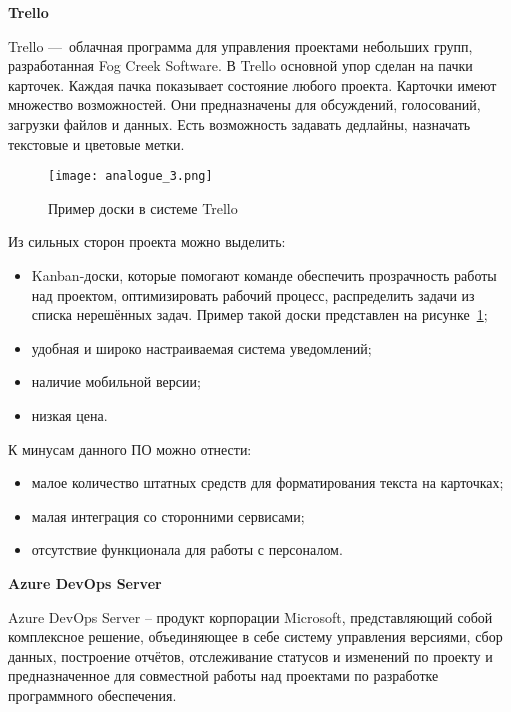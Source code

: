 \bigskip
\textbf{Trello}

Trello — облачная программа для управления проектами небольших групп, разработанная Fog Creek Software. В Trello основной упор сделан на пачки карточек. Каждая пачка показывает состояние любого проекта. Карточки имеют множество возможностей. Они предназначены для обсуждений, голосований, загрузки файлов и данных. Есть возможность задавать дедлайны, назначать текстовые и цветовые метки.

\begin{figure}[ht]
    \centering
	\texttt{[image: analogue\_3.png]}
	\caption{Пример доски в системе Trello}\label{fig:analysis:analogue_3:picture}
\end{figure}

Из сильных сторон проекта можно выделить:
\begin{itemize}
    \item Kanban-доски, которые помогают команде обеспечить прозрачность работы над проектом, оптимизировать рабочий процесс, распределить задачи из списка нерешённых задач. Пример такой доски представлен на рисунке~\ref{fig:analysis:analogue_3:picture};
    \item удобная и широко настраиваемая система уведомлений;
    \item наличие мобильной версии;
    \item низкая цена.
\end{itemize}

К минусам данного ПО можно отнести:
\begin{itemize}
    \item малое количество штатных средств для форматирования текста на карточках;
    \item малая интеграция со сторонними сервисами;
    \item отсутствие функционала для работы с персоналом.
\end{itemize}

\bigskip
\textbf{Azure DevOps Server}

Azure DevOps Server – продукт корпорации Microsoft, представляющий собой комплексное решение, объединяющее в себе систему управления версиями, сбор данных, построение отчётов, отслеживание статусов и изменений по проекту и предназначенное для совместной работы над проектами по разработке программного обеспечения.

